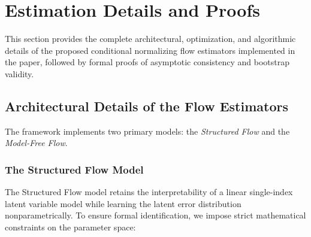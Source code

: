 \documentclass{article}
\numberwithin{figure}{section}
\numberwithin{table}{section}
\numberwithin{equation}{section}
\begin{document}
\clearpage

\section{Estimation Details and Proofs}
\label{app:estimation}

This section provides the complete architectural, optimization, and algorithmic details of the proposed conditional normalizing flow estimators implemented in the paper, followed by formal proofs of asymptotic consistency and bootstrap validity.

\subsection{Architectural Details of the Flow Estimators}
\label{appsub:architecture}

The framework implements two primary models: the \textit{Structured Flow} and the \textit{Model-Free Flow}. 

\subsubsection{The Structured Flow Model}
The Structured Flow model retains the interpretability of a linear single-index latent variable model while learning the latent error distribution nonparametrically. To ensure formal identification, we impose strict mathematical constraints on the parameter space:
\end{document}
